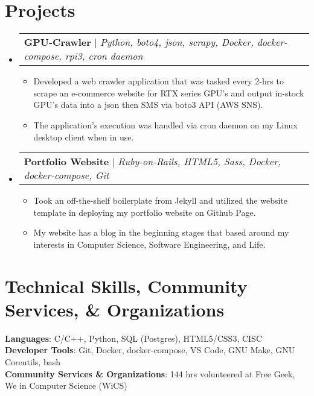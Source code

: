 \documentclass[letterpaper,11pt]{article}
\makeatletter
\newcommand{\resumeItem}[1]{
  \item\small{
    {#1 \vspace{-2pt}}
  }
}
\newcommand{\resumeProjectHeading}[2]{
    \item
    \begin{tabular*}{0.97\textwidth}{l@{\extracolsep{\fill}}r}
      \small#1 & #2 \\
    \end{tabular*}\vspace{-7pt}
}
\newcommand{\resumeSubHeadingListStart}{\begin{itemize}[leftmargin=0.15in, label={}]}
\newcommand{\resumeSubHeadingListEnd}{\end{itemize}}
\newcommand{\resumeItemListStart}{\begin{itemize}}
\newcommand{\resumeItemListEnd}{\end{itemize}\vspace{-5pt}}
\makeatother
\begin{document}
\section{Projects}
    \resumeSubHeadingListStart
      \resumeProjectHeading
          {\textbf{GPU-Crawler} $|$ \emph{Python, boto4, json, scrapy, Docker, docker-compose, rpi3, cron daemon}}{}
          \resumeItemListStart
            \resumeItem{Developed a web crawler application that was tasked every 2-hrs to scrape an e-commerce website for RTX series GPU's and output in-stock GPU's data into a json then SMS via boto3 API (AWS SNS).}
            \resumeItem{The application's execution was handled via cron daemon on my Linux desktop client when in use.}
          \resumeItemListEnd
      \resumeProjectHeading
          {\textbf{Portfolio Website} $|$ \emph{Ruby-on-Rails, HTML5, Sass, Docker, docker-compose, Git}}{}
          \resumeItemListStart
            \resumeItem{Took an off-the-shelf boilerplate from Jekyll and utilized the website template in deploying my portfolio website on Github Page.}
            \resumeItem{My website has a blog in the beginning stages that based around my interests in Computer Science, Software Engineering, and Life.}
          \resumeItemListEnd
    \resumeSubHeadingListEnd



%
\section{Technical Skills, Community Services, \& Organizations}
 \begin{itemize}[leftmargin=0.15in, label={}]
    \small{\item{
     \textbf{Languages}{: C/C++, Python, SQL (Postgres), HTML5/CSS3, CISC} \\
     \textbf{Developer Tools}{: Git, Docker, docker-compose, VS Code, GNU Make, GNU Coreutils, bash} \\
     \textbf{Community Services \& Organizations}{: 144 hrs volunteered at Free Geek, We in Computer Science (WiCS) }
    }}
 \end{itemize}


\end{document}
